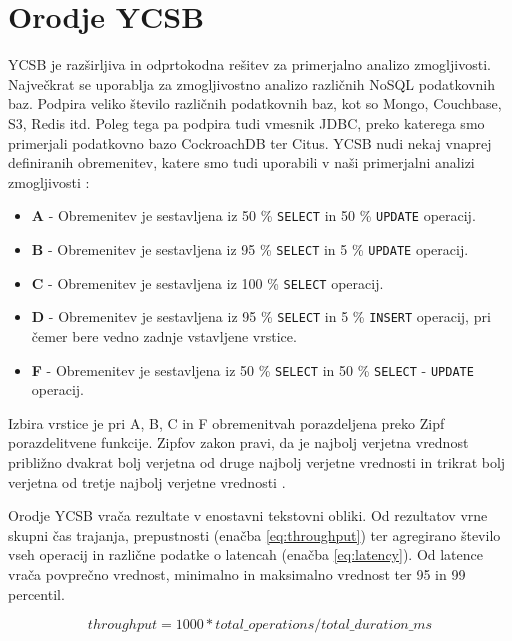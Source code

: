 \documentclass[a4paper, 12pt]{book}
\begin{document}
\section{Orodje YCSB}
\label{YCSB_about}
YCSB \cite{brianfrankcooper/YCSB} je razširljiva in odprtokodna rešitev za primerjalno analizo zmogljivosti. Največkrat se uporablja za zmogljivostno analizo različnih NoSQL podatkovnih baz. Podpira veliko število različnih podatkovnih baz, kot so  Mongo, Couchbase, S3, Redis itd. Poleg tega pa podpira tudi vmesnik JDBC, preko katerega smo primerjali podatkovno bazo CockroachDB ter Citus. YCSB nudi nekaj vnaprej definiranih obremenitev, katere smo tudi uporabili v naši primerjalni analizi zmogljivosti \cite{YCSB-core-workloads}:
\begin{itemize}
    \item \textbf{A} - Obremenitev je sestavljena iz 50 \% \texttt{SELECT} in 50 \% \texttt{UPDATE} operacij.
    \item \textbf{B} - Obremenitev je sestavljena iz 95 \% \texttt{SELECT} in 5 \% \texttt{UPDATE} operacij.
    \item \textbf{C} - Obremenitev je sestavljena iz 100 \% \texttt{SELECT} operacij.
    \item \textbf{D} - Obremenitev je sestavljena iz 95 \% \texttt{SELECT} in 5 \% \texttt{INSERT} operacij, pri čemer bere vedno zadnje vstavljene vrstice.
    \item \textbf{F} - Obremenitev je sestavljena iz 50 \% \texttt{SELECT} in 50 \% \texttt{SELECT} - \texttt{UPDATE} operacij.
\end{itemize}

Izbira vrstice je pri A, B, C in F obremenitvah porazdeljena preko Zipf porazdelitvene funkcije. Zipfov zakon pravi, da je najbolj verjetna vrednost približno dvakrat bolj verjetna od druge najbolj verjetne vrednosti in trikrat bolj verjetna od tretje najbolj verjetne vrednosti \cite{zipfs-law}.

Orodje YCSB vrača rezultate v enostavni tekstovni obliki. Od rezultatov vrne skupni čas trajanja, prepustnosti (enačba \ref{eq:throughput}) ter agregirano število vseh operacij in različne podatke o latencah (enačba \ref{eq:latency}). Od latence vrača povprečno vrednost, minimalno in maksimalno vrednost ter 95 in 99 percentil.

\begin{equation} \label{eq:throughput}
throughput = 1000 * total\_operations / total\_duration\_ms
\end{equation}
\end{document}
